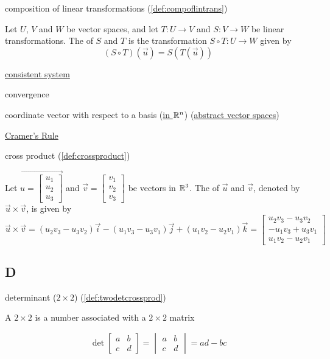 \documentclass{ximera}
\begin{document}
composition of linear transformations (\ref{def:compoflintrans})
\begin{expandable}
    Let $U$, $V$ and $W$ be vector spaces, and let $T:U\rightarrow V$ and $S:V\rightarrow W$ be linear transformations.  The  of $S$ and $T$ is the transformation $S\circ T:U\rightarrow W$ given by
$$(S\circ T)(\vec{u})=S(T(\vec{u}))$$
\end{expandable}

\href{https://ximera.osu.edu/oerlinalg/LinearAlgebra/SYS-0010/main}{consistent system}

convergence

coordinate vector with respect to a basis (\href{https://ximera.osu.edu/oerlinalg/LinearAlgebra/VSP-0030/main}{in $\mathbb{R}^n$}) (\href{https://ximera.osu.edu/oerlinalg/LinearAlgebra/VSP-0060/main}{abstract vector spaces})

\href{https://ximera.osu.edu/oerlinalg/LinearAlgebra/DET-0060/main}{Cramer's Rule}

cross product (\ref{def:crossproduct})
\begin{expandable}
    Let $\vec{u=\begin{bmatrix}u_1\\u_2\\u_3\end{bmatrix}}$ and $\vec{v}=\begin{bmatrix}v_1\\v_2\\v_3\end{bmatrix}$ be vectors in $\mathbb{R}^3$.  The  of $\vec{u}$ and $\vec{v}$, denoted by $\vec{u}\times\vec{v}$, is given by
$$\vec{u}\times\vec{v}=(u_2v_3-u_3v_2)\vec{i}-(u_1v_3-u_3v_1)\vec{j}+(u_1v_2-u_2v_1)\vec{k}
=\begin{bmatrix}u_2v_3-u_3v_2\\-u_1v_3+u_3v_1\\u_1v_2-u_2v_1\end{bmatrix}$$
\end{expandable}

\subsection{D}
determinant ($2\times 2$) (\ref{def:twodetcrossprod})
\begin{expandable}
    A $2\times 2$  is a number associated with a $2\times 2$ matrix

$$\det{\begin{bmatrix}
a & b\\
c & d
\end{bmatrix}}=\begin{vmatrix}
a & b\\
c & d
\end{vmatrix} =ad-bc$$
\end{expandable}
\end{document}
